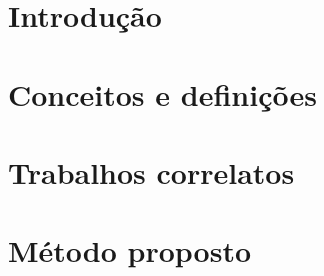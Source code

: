 \documentclass[
	12pt,				%
    oneside,
	a4paper,			%
	chapter=TITLE,		%
	english,			%
	brazil				%
	]{abntex2}
\begin{document}
\renewcommand{\contentsname}{Sumário}
\tableofcontents*
\cleardoublepage



\textual
\chapter{Introdução}


\chapter{Conceitos e definições}


\chapter{Trabalhos correlatos}


\chapter{Método proposto}


% 
%
\end{document}

